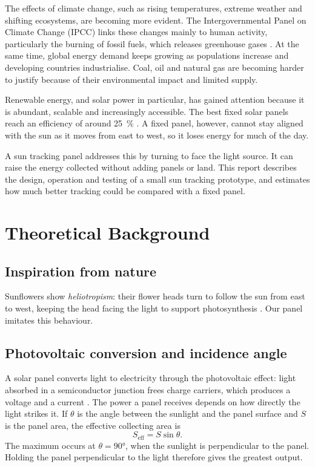 \documentclass[11pt,a4paper]{article}
\begin{document}
The effects of climate change, such as rising temperatures, extreme weather and shifting ecosystems, are becoming more evident. The Intergovernmental Panel on Climate Change (IPCC) links these changes mainly to human activity, particularly the burning of fossil fuels, which releases greenhouse gases \cite{ipcc}. At the same time, global energy demand keeps growing as populations increase and developing countries industrialise. Coal, oil and natural gas are becoming harder to justify because of their environmental impact and limited supply.

Renewable energy, and solar power in particular, has gained attention because it is abundant, scalable and increasingly accessible. The best fixed solar panels reach an efficiency of around \SI{25}{\percent} \cite{cnet}. A fixed panel, however, cannot stay aligned with the sun as it moves from east to west, so it loses energy for much of the day.

A sun tracking panel addresses this by turning to face the light source. It can raise the energy collected without adding panels or land. This report describes the design, operation and testing of a small sun tracking prototype, and estimates how much better tracking could be compared with a fixed panel.

\section{Theoretical Background}

\subsection{Inspiration from nature}
Sunflowers show \emph{heliotropism}: their flower heads turn to follow the sun from east to west, keeping the head facing the light to support photosynthesis \cite{helio}. Our panel imitates this behaviour.

\subsection{Photovoltaic conversion and incidence angle}
A solar panel converts light to electricity through the photovoltaic effect: light absorbed in a semiconductor junction frees charge carriers, which produces a voltage and a current \cite{pv}. The power a panel receives depends on how directly the light strikes it. If $\theta$ is the angle between the sunlight and the panel surface and $S$ is the panel area, the effective collecting area is
\begin{equation}
  S_{\text{eff}} = S\sin\theta .
\end{equation}
The maximum occurs at $\theta=\ang{90}$, when the sunlight is perpendicular to the panel. Holding the panel perpendicular to the light therefore gives the greatest output.
\end{document}
